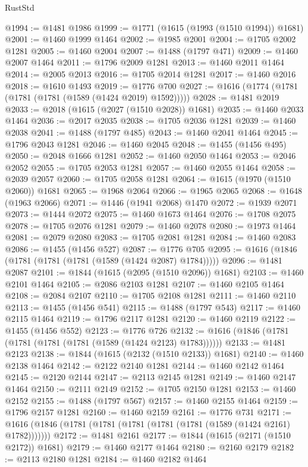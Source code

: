 \begin{lexlean}{RustStd}
\begin{coremodule}
@1994 := @1481 @1986
@1999 := @1771 (@1615 (@1993 (@1510 @1994)) @1681)
@2001 := @1460 @1999 @1464
@2002 := @1985 @2001
@2004 := @1705 @2002 @1281
@2005 := @1460 @2004
@2007 := @1488 (@1797 @471)
@2009 := @1460 @2007 @1464
@2011 := @1796 @2009 @1281
@2013 := @1460 @2011 @1464
@2014 := @2005 @2013
@2016 := @1705 @2014 @1281
@2017 := @1460 @2016
@2018 := @1610 @1493
@2019 := @1776 @700
@2027 := @1616 (@1774 (@1781 (@1781 (@1781 (@1589 (@1424 @2019) @1592)))))
@2028 := @1481 @2019
@2033 := @2018 (@1615 (@2027 (@1510 @2028)) @1681)
@2035 := @1460 @2033 @1464
@2036 := @2017 @2035
@2038 := @1705 @2036 @1281
@2039 := @1460 @2038
@2041 := @1488 (@1797 @485)
@2043 := @1460 @2041 @1464
@2045 := @1796 @2043 @1281
@2046 := @1460 @2045
@2048 := @1455 (@1456 @495)
@2050 := @2048 @1666 @1281
@2052 := @1460 @2050 @1464
@2053 := @2046 @2052
@2055 := @1705 @2053 @1281
@2057 := @1460 @2055 @1464
@2058 := @2039 @2057
@2060 := @1705 @2058 @1281
@2064 := @1615 (@1970 (@1510 @2060)) @1681
@2065 := @1968 @2064
@2066 := @1965 @2065
@2068 := @1648 (@1963 @2066)
@2071 := @1446 (@1941 @2068) @1470
@2072 := @1939 @2071
@2073 := @1444 @2072
@2075 := @1460 @1673 @1464
@2076 := @1708 @2075
@2078 := @1705 @2076 @1281
@2079 := @1460 @2078
@2080 := @1973 @1464
@2081 := @2079 @2080
@2083 := @1705 @2081 @1281
@2084 := @1460 @2083
@2086 := @1455 (@1456 @527)
@2087 := @1776 @705
@2095 := @1616 (@1846 (@1781 (@1781 (@1781 (@1589 (@1424 @2087) @1784)))))
@2096 := @1481 @2087
@2101 := @1844 (@1615 (@2095 (@1510 @2096)) @1681)
@2103 := @1460 @2101 @1464
@2105 := @2086 @2103 @1281
@2107 := @1460 @2105 @1464
@2108 := @2084 @2107
@2110 := @1705 @2108 @1281
@2111 := @1460 @2110
@2113 := @1455 (@1456 @541)
@2115 := @1488 (@1797 @543)
@2117 := @1460 @2115 @1464
@2119 := @1796 @2117 @1281
@2120 := @1460 @2119
@2122 := @1455 (@1456 @552)
@2123 := @1776 @726
@2132 := @1616 (@1846 (@1781 (@1781 (@1781 (@1781 (@1589 (@1424 @2123) @1783))))))
@2133 := @1481 @2123
@2138 := @1844 (@1615 (@2132 (@1510 @2133)) @1681)
@2140 := @1460 @2138 @1464
@2142 := @2122 @2140 @1281
@2144 := @1460 @2142 @1464
@2145 := @2120 @2144
@2147 := @2113 @2145 @1281
@2149 := @1460 @2147 @1464
@2150 := @2111 @2149
@2152 := @1705 @2150 @1281
@2153 := @1460 @2152
@2155 := @1488 (@1797 @567)
@2157 := @1460 @2155 @1464
@2159 := @1796 @2157 @1281
@2160 := @1460 @2159
@2161 := @1776 @731
@2171 := @1616 (@1846 (@1781 (@1781 (@1781 (@1781 (@1781 (@1589 (@1424 @2161) @1782)))))))
@2172 := @1481 @2161
@2177 := @1844 (@1615 (@2171 (@1510 @2172)) @1681)
@2179 := @1460 @2177 @1464
@2180 := @2160 @2179
@2182 := @2113 @2180 @1281
@2184 := @1460 @2182 @1464

\end{coremodule}
\end{lexlean}
